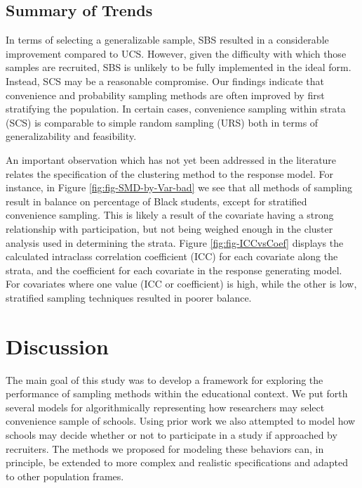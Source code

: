 \documentclass[
  english,
  man,floatsintext]{apa6}
\begin{document}
\hypertarget{summary-of-trends}{%
\subsection{Summary of Trends}\label{summary-of-trends}}

In terms of selecting a generalizable sample, SBS resulted in a considerable improvement compared to UCS. However, given the difficulty with which those samples are recruited, SBS is unlikely to be fully implemented in the ideal form. Instead, SCS may be a reasonable compromise. Our findings indicate that convenience and probability sampling methods are often improved by first stratifying the population. In certain cases, convenience sampling within strata (SCS) is comparable to simple random sampling (URS) both in terms of generalizability and feasibility.

An important observation which has not yet been addressed in the literature relates the specification of the clustering method to the response model. For instance, in Figure \ref{fig:fig-SMD-by-Var-bad} we see that all methods of sampling result in balance on percentage of Black students, except for stratified convenience sampling. This is likely a result of the covariate having a strong relationship with participation, but not being weighed enough in the cluster analysis used in determining the strata. Figure \ref{fig:fig-ICCvsCoef} displays the calculated intraclass correlation coefficient (ICC) for each covariate along the strata, and the coefficient for each covariate in the response generating model. For covariates where one value (ICC or coefficient) is high, while the other is low, stratified sampling techniques resulted in poorer balance.

\hypertarget{discussion}{%
\section{Discussion}\label{discussion}}

The main goal of this study was to develop a framework for exploring the performance of sampling methods within the educational context. We put forth several models for algorithmically representing how researchers may select convenience sample of schools. Using prior work we also attempted to model how schools may decide whether or not to participate in a study if approached by recruiters. The methods we proposed for modeling these behaviors can, in principle, be extended to more complex and realistic specifications and adapted to other population frames.
\end{document}
